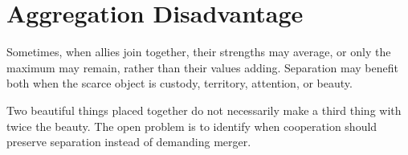 \chapter{Aggregation Disadvantage}
\label{chap:aggregation-disadvantage}


Sometimes, when allies join together, their strengths may average, or only the
maximum may remain, rather than their values adding. Separation may benefit
both when the scarce object is custody, territory, attention, or beauty.

Two beautiful things placed together do not necessarily make a third thing
with twice the beauty. The open problem is to identify when cooperation should
preserve separation instead of demanding merger.
